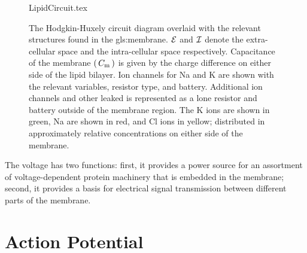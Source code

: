 \documentclass[../../Orator]{subfiles}
\begin{document}
\begin{figure}[ht]
    \centering
    {LipidCircuit.tex}
    \caption{The Hodgkin-Huxely circuit diagram overlaid with the relevant structures found in the \gls{gls:membrane}. \(\mathcal{E}\) and \(\mathcal{I}\) denote the extra-cellular space and the intra-cellular space respectively. Capacitance of the membrane \(\left(\,C_{\mathrm{m}}\,\right)\) is given by the charge difference on either side of the lipid bilayer. Ion channels for \gls{Na} and \gls{K} are shown with the relevant variables, resistor type, and battery. Additional ion channels and other leaked is represented as a lone resistor and battery outside of the membrane region. The \gls{K} ions are shown in green, \gls{Na} are shown in red, and \gls{Cl} ions in yellow; distributed in approximately relative concentrations on either side of the membrane. }\label{fig:MembraneCircut}
\end{figure}


The voltage has two functions: first, it provides a power source for an assortment of voltage-dependent protein machinery that is embedded in the membrane; second, it provides a basis for electrical signal transmission between different parts of the membrane.



\section{Action Potential}
\end{document}

